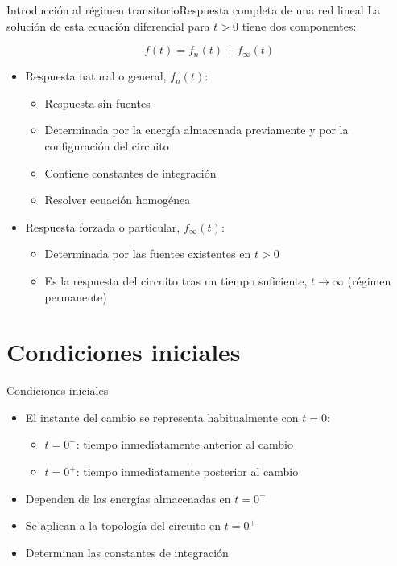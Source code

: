 \documentclass[aspectratio=169, xcolor={usenames,svgnames,dvipsnames}]{beamer}
\begin{document}
\begin{frame}{Introducción al régimen transitorio}{Respuesta completa de una red lineal}
La solución de esta ecuación diferencial para \(t > 0\) tiene dos componentes:

\[
 \boxed{f(t) = f_n(t) + f_\infty(t) }
 \]

\begin{itemize}
\item Respuesta \alert{natural} o general, \(f_n(t)\):
\begin{itemize}
\item Respuesta sin fuentes
\item Determinada por la energía almacenada previamente y por la configuración del circuito
\item Contiene constantes de integración
\item Resolver \alert{ecuación homogénea}
\end{itemize}
\item Respuesta \alert{forzada} o particular, \(f_\infty(t)\):
\begin{itemize}
\item Determinada por las fuentes existentes en \(t > 0\)
\item Es la respuesta del circuito tras un tiempo suficiente, \(t \to \infty\) (régimen permanente)
\end{itemize}
\end{itemize}
\end{frame}

\section{Condiciones iniciales}

\begin{frame}{Condiciones iniciales}
\begin{itemize}
\item El instante del cambio se representa habitualmente con \(t = 0\):
\begin{itemize}
\item \(t = 0^-\): tiempo inmediatamente anterior al cambio
\item \(t = 0^+\): tiempo inmediatamente posterior al cambio
\end{itemize}

\item Dependen de las \alert{energías almacenadas} en $t=0^-$

\item Se aplican a la \alert{topología} del circuito en \(t = 0^+\)

\item Determinan las constantes de integración
\end{itemize}
\end{frame}
\end{document}
